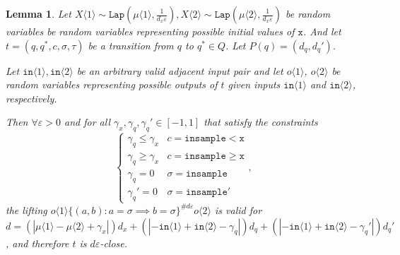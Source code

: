 \documentclass[12pt]{article}
\newcommand{\gguard}[1][x]{\texttt{insample}\geq#1}
\newcommand{\lguard}[1][x]{\texttt{insample} < #1}
\newcommand{\brangle}[1]{\langle#1 \rangle}
\newcommand{\Lap}{\texttt{Lap}}
\newtheorem{lemma}[thm]{Lemma}
\theoremstyle{definition}
\begin{document}
\begin{lemma}\label{indTransitionCoupling}
    Let $X\brangle{1}\sim \Lap(\mu\brangle{1}, \frac{1}{d_x\varepsilon}), X\brangle{2}\sim\Lap(\mu\brangle{2}, \frac{1}{d_x\varepsilon})$ be random variables be random variables representing possible initial values of $\texttt{x}$. And let $t = (q, q^*, c, \sigma, \tau)$ be a transition from $q$ to $q^*\in Q$.
    Let $P(q) = (d_q, d_q')$.

    Let $\texttt{in}\brangle{1}, \texttt{in}\brangle{2}$ be an arbitrary valid adjacent input pair and let $o\brangle{1}$, $o\brangle{2}$ be random variables representing possible outputs of $t$ given inputs $\texttt{in}\brangle{1}$ and $\texttt{in}\brangle{2}$, respectively. 

    Then $\forall \varepsilon>0$ and for all $\gamma_x, \gamma_q, \gamma_q'\in [-1, 1]$ that satisfy the constraints \[
        \begin{cases}
          \gamma_q\leq\gamma_x & c = \lguard[\texttt{x}]\\
          \gamma_q\geq\gamma_x & c = \gguard[\texttt{x}]\\
          \gamma_q=0 & \sigma = \texttt{insample}\\
          \gamma_q'=0 & \sigma = \texttt{insample}'
        \end{cases},
      \]
      the lifting $o\brangle{1}\{(a, b): a=\sigma\implies b=\sigma\}^{\#d\varepsilon}o\brangle{2}$ is valid for $d = (|\mu\brangle{1}-\mu\brangle{2}+\gamma_x|)d_x+(|-\texttt{in}\brangle{1}+\texttt{in}\brangle{2}-\gamma_q|)d_q+(|-\texttt{in}\brangle{1}+\texttt{in}\brangle{2}-\gamma_q'|)d_q'$, and therefore $t$ is $d\varepsilon$-close. 
\end{lemma}
\end{document}
